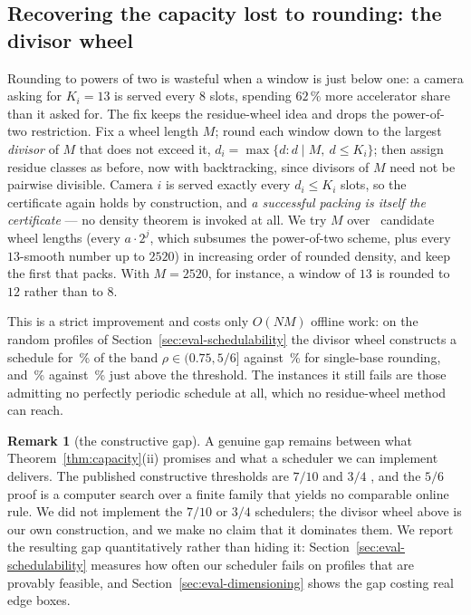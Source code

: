 \documentclass[preprint,review,12pt]{elsarticle}
\theoremstyle{definition}
\newtheorem{remark}[theorem]{Remark}
\newcommand{\Nc}{N}
\newcommand{\dens}{\rho}
\begin{document}
\subsection{Recovering the capacity lost to rounding: the divisor wheel}\label{sec:wheel}
Rounding to powers of two is wasteful when a window is just below one: a camera asking for
$K_i=13$ is served every $8$ slots, spending $62\,\%$ more accelerator share than it asked for.
The fix keeps the residue-wheel idea and drops the power-of-two restriction. Fix a wheel length
$M$; round each window down to the largest \emph{divisor} of $M$ that does not exceed it,
$d_i=\max\{d: d\mid M,\ d\le K_i\}$; then assign residue classes as before, now with
backtracking, since divisors of $M$ need not be pairwise divisible. Camera $i$ is served exactly
every $d_i\le K_i$ slots, so the certificate again holds by construction, and \emph{a successful
packing is itself the certificate} --- no density theorem is invoked at all. We try $M$ over
\numEoneWheelCands\ candidate wheel lengths (every $a\cdot2^j$, which subsumes the power-of-two
scheme, plus every $13$-smooth number up to $2520$) in increasing order of rounded density, and
keep the first that packs. With $M=2520$, for instance, a window of $13$ is rounded to $12$
rather than to $8$.

This is a strict improvement and costs only $O(\Nc M)$ offline work: on the random profiles of
Section~\ref{sec:eval-schedulability} the divisor wheel constructs a schedule for
\numEoneWheelEightPct\,\% of the band $\dens\in(0.75,5/6]$ against \numEoneHarmEightPct\,\% for
single-base rounding, and \numEoneWheelNinePct\,\% against \numEoneHarmNinePct\,\% just above the
threshold. The instances it still fails are those admitting no perfectly periodic schedule at
all, which no residue-wheel method can reach.

\begin{remark}[the constructive gap]\label{rem:gap}
A genuine gap remains between what Theorem~\ref{thm:capacity}(ii) promises and what a scheduler we
can implement delivers. The published constructive thresholds are $7/10$
\cite{chanchin1993schedulers} and $3/4$ \cite{fishburn2002densities}, and the $5/6$ proof is a
computer search over a finite family that yields no comparable online rule. We did not implement
the $7/10$ or $3/4$ schedulers; the divisor wheel above is our own construction, and we make no
claim that it dominates them. We report the resulting gap quantitatively rather than hiding it:
Section~\ref{sec:eval-schedulability} measures how often our scheduler fails on profiles that are
provably feasible, and Section~\ref{sec:eval-dimensioning} shows the gap costing real edge boxes.
\end{remark}
\end{document}
